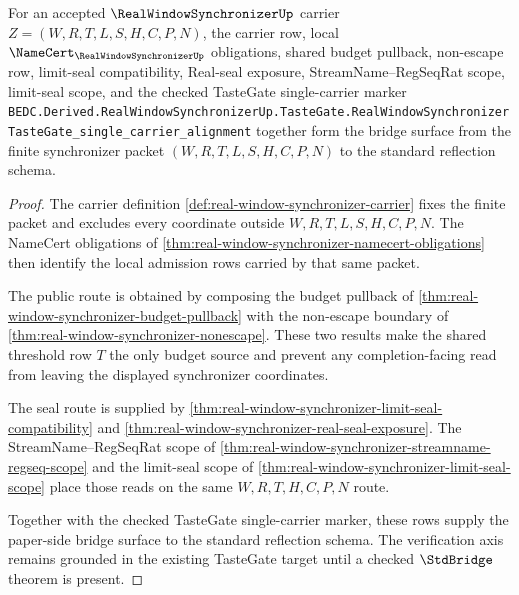 \begin{theorem}
\label{thm:real-window-synchronizer-standard-bridge-surface}
For an accepted $\RealWindowSynchronizerUp$ carrier $Z=(W,R,T,L,S,H,C,P,N)$, the carrier row, local $\NameCert_{\RealWindowSynchronizerUp}$ obligations, shared budget pullback, non-escape row, limit-seal compatibility, Real-seal exposure, StreamName--RegSeqRat scope, limit-seal scope, and the checked TasteGate single-carrier marker
\texttt{BEDC.Derived.RealWindowSynchronizerUp.TasteGate.RealWindowSynchronizerTasteGate\_single\_carrier\_alignment}
together form the bridge surface from the finite synchronizer packet $(W,R,T,L,S,H,C,P,N)$ to the standard reflection schema.
\end{theorem}
\begin{proof}
The carrier definition \autoref{def:real-window-synchronizer-carrier} fixes the finite packet and excludes every coordinate outside $W,R,T,L,S,H,C,P,N$. The NameCert obligations of \autoref{thm:real-window-synchronizer-namecert-obligations} then identify the local admission rows carried by that same packet.

The public route is obtained by composing the budget pullback of \autoref{thm:real-window-synchronizer-budget-pullback} with the non-escape boundary of \autoref{thm:real-window-synchronizer-nonescape}. These two results make the shared threshold row $T$ the only budget source and prevent any completion-facing read from leaving the displayed synchronizer coordinates.

The seal route is supplied by \autoref{thm:real-window-synchronizer-limit-seal-compatibility} and \autoref{thm:real-window-synchronizer-real-seal-exposure}. The StreamName--RegSeqRat scope of \autoref{thm:real-window-synchronizer-streamname-regseq-scope} and the limit-seal scope of \autoref{thm:real-window-synchronizer-limit-seal-scope} place those reads on the same $W,R,T,H,C,P,N$ route.

Together with the checked TasteGate single-carrier marker, these rows supply the paper-side bridge surface to the standard reflection schema. The verification axis remains grounded in the existing TasteGate target until a checked $\StdBridge$ theorem is present.
\end{proof}


